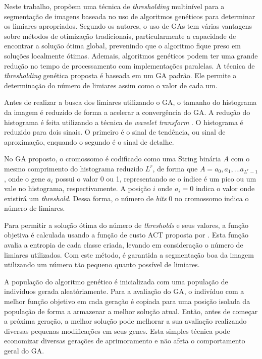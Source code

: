\documentclass[12pt,oneside,a4paper,english,french,spanish,brazil,]{abntex2}
\begin{document}
Neste trabalho, \citet{hammouche:2008} propõem uma técnica de \textit{thresholding} multinível para a segmentação de imagens baseada no uso de algoritmos genéticos para determinar os limiares apropriados. Segundo os autores, o uso de GAs tem várias vantagens sobre métodos de otimização tradicionais, particularmente a capacidade de encontrar a solução ótima global, prevenindo que o algoritmo fique preso em soluções localmente ótimas. Ademais, algoritmos genéticos podem ter uma grande redução no tempo de processamento com implementações paralelas. A técnica de \textit{thresholding} genética proposta é baseada em um GA padrão. Ele permite a determinação do número de limiares assim como o valor de cada um. 

Antes de realizar a busca dos limiares utilizando o GA, o tamanho do histograma da imagem é reduzido de forma a acelerar a convergência do GA. A redução do histograma é feita utilizando a técnica de \textit{wavelet transform} \cite{kim:2003}. O histograma é reduzido para dois sinais. O primeiro é o sinal de tendência, ou sinal de aproximação, enquando o segundo é o sinal de detalhe.

No GA proposto, o cromossomo é codificado como uma String binária \(A\) com o mesmo comprimento do histograma reduzido \(L^r\), de forma que \(A = a_0, a_1, ... a_{L^r-1}\), onde o gene \(a_i\) possui o valor 0 ou 1, representando se o índice é um pico ou um vale no histograma, respectivamente. A posição \(i\) onde \(a_i = 0\) indica o valor onde existirá um \textit{threshold}. Dessa forma, o número de \textit{bits} 0 no cromossomo indica o número de limiares.

Para permitir a solução ótima do número de \textit{thresholds} e seus valores, a função objetiva é calculada usando a função de custo ACT proposta por \citet{yen:1995}. Esta função avalia a entropia de cada classe criada, levando em consideração o número de limiares utilizados. Com este método, é garantida a segmentação boa da imagem utilizando um número tão pequeno quanto possível de limiares.

A população do algoritmo genético é inicializada com uma população de individuos gerada aleatóriamente. Para a avaliação do GA, o indivíduo com a melhor função objetivo em cada geração é copiada para uma posição isolada da população de forma a armazenar a melhor solução atual. Então, antes de começar a próxima geração, a melhor solução pode melhorar a sua avaliação realizando diversas pequenas modificações em seus genes. Esta simples técnica pode economizar diversas gerações de aprimoramento e não afeta o comportamento geral do GA.
\end{document}
